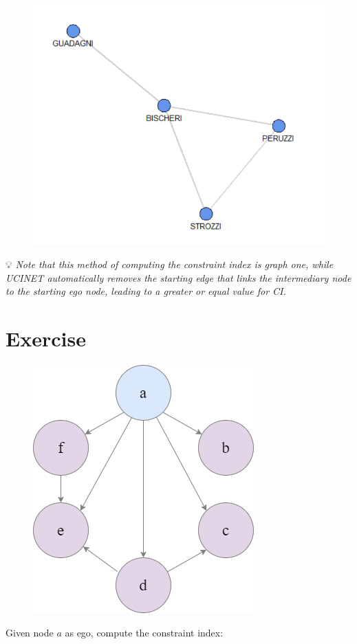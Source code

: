 \documentclass[
  notitlepage,
  onecolumn,
  openany]{book}
\begin{document}
\begin{figure}[h!]

{\centering \includegraphics[width=0.3\linewidth]{images/08-Metrics for structural holes/Untitled 6} 

}

\end{figure}

💡 \emph{Note that this method of computing the constraint index is graph one, while UCINET automatically removes the starting edge that links the intermediary node to the starting ego node, leading to a greater or equal value for CI.}

\hypertarget{exercise}{%
\section{Exercise}\label{exercise}}

\begin{figure}[h!]

{\centering \includegraphics[width=0.35\linewidth]{images/08-Metrics for structural holes/08-constraint_index_example} 

}

\end{figure}

Given node \(a\) as ego, compute the constraint index:
\end{document}
